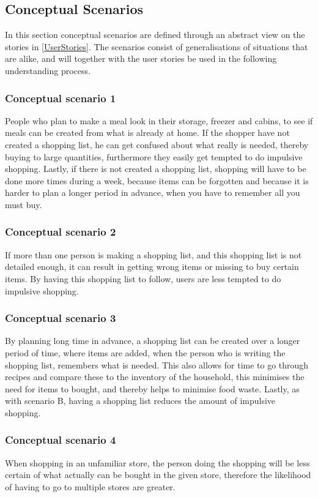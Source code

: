 \subsection{Conceptual Scenarios} \label{conceptualScenarios}
In this section conceptual scenarios are defined through an abstract view on the stories in \cref{UserStories}. The scenarios consist of generalisations of situations that are alike, and will together with the user stories be used in the following understanding process.

\subsubsection{Conceptual scenario 1}
People who plan to make a meal look in their storage, freezer and cabins, to see if meals can be created from what is already at home. If the shopper have not created a shopping list, he can get confused about what really is needed, thereby buying to large quantities, furthermore they easily get tempted to do impulsive shopping. Lastly, if there is not created a shopping list, shopping will have to be done more times during a week, because items can be forgotten and because it is harder to plan a longer period in advance, when you have to remember all you must buy.

\subsubsection{Conceptual scenario 2}
If more than one person is making a shopping list, and this shopping list is not detailed enough, it can result in getting wrong items or missing to buy certain items. By having this shopping list to follow, users are less tempted to do impulsive shopping.

\subsubsection{Conceptual scenario 3}
By planning long time in advance, a shopping list can be created over a longer period of time, where items are added, when the person who is writing the shopping list, remembers what is needed. This also allows for time to go through recipes and compare these to the inventory of the household, this minimises the need for items to bought, and thereby helps to minimise food waste. Lastly, as with scenario B, having a shopping list reduces the amount of impulsive shopping.

\subsubsection{Conceptual scenario 4}
When shopping in an unfamiliar store, the person doing the shopping will be less certain of what actually can be bought in the given store, therefore the likelihood of having to go to multiple stores are greater.